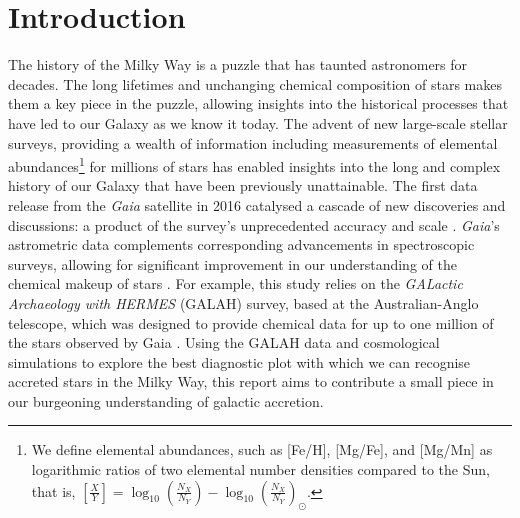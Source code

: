 \documentclass[fleqn,usenatbib]{mnras}
\newcommand{\Gaia}{\textit{Gaia}\xspace} %
\begin{document}


\section{Introduction}
\label{sec:intro}

The history of the Milky Way is a puzzle that has taunted astronomers for decades. The long lifetimes and unchanging chemical composition of stars makes them a key piece in the puzzle, allowing insights into the historical processes that have led to our Galaxy as we know it today. The advent of new large-scale stellar surveys, providing a wealth of information including measurements of elemental abundances\footnote{We define elemental abundances, such as [Fe/H], [Mg/Fe], and [Mg/Mn] as logarithmic ratios of two elemental number densities compared to the Sun, that is, $\left[\frac{X}{Y}\right]=\log_{10}\left(\frac{N_X}{N_Y}\right) -\log_{10}\left(\frac{N_X}{N_Y}\right)_\odot$.}  for millions of stars has enabled insights into the long and complex history of our Galaxy that have been previously unattainable. The first data release from the \Gaia satellite in 2016 \citep{Brown2016} catalysed a cascade of new discoveries and discussions: a product of the survey’s unprecedented accuracy and scale \citep{BlandHawthorn2019}. \Gaia’s astrometric data complements corresponding advancements in spectroscopic surveys, allowing for significant improvement in our understanding of the chemical makeup of stars \citep{Buck2021}. For example, this study relies on the \textit{GALactic Archaeology with HERMES} (GALAH) survey, based at the Australian-Anglo telescope, which was designed to provide chemical data for up to one million of the stars observed by Gaia \citep{Buder2021}. Using the GALAH data and cosmological simulations to explore the best diagnostic plot with which we can recognise accreted stars in the Milky Way, this report aims to contribute a small piece in our burgeoning understanding of galactic accretion. 
\end{document}
